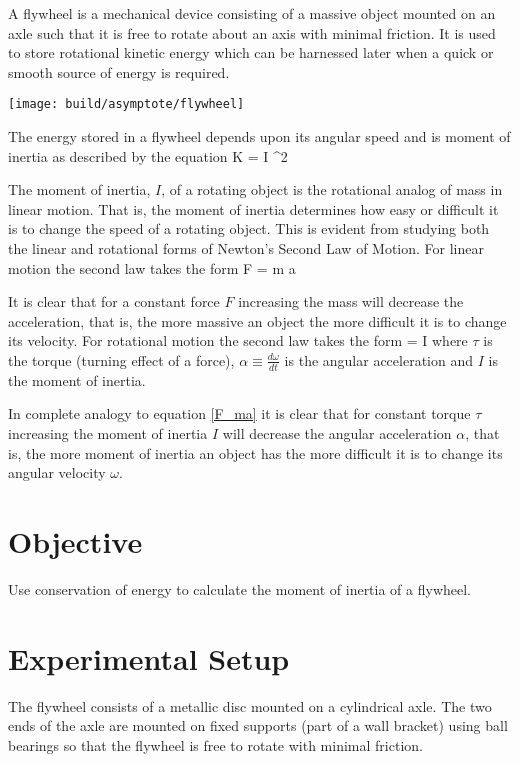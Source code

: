 A flywheel is a mechanical device consisting of a massive object mounted on an axle such that it is free to rotate about an axis with minimal friction. It is used to store rotational kinetic energy which can be harnessed later when a quick or smooth source of energy is required.

\begin{center}
    \texttt{[image: build/asymptote/flywheel]}
\end{center}

The energy stored in a flywheel depends upon its angular speed and is moment of inertia as described by the equation
%
\beq
    K =  I \omega^2
\eeq
%

The moment of inertia, $I$, of a rotating object is the rotational analog of mass in linear motion. That is, the moment of inertia determines how easy or difficult it is to change the speed of a rotating object. This is evident from studying both the linear and rotational forms of Newton's Second Law of Motion. For linear motion the second law takes the form
%
\beq \label{F_ma}
    F = m a
\eeq

It is clear that for a constant force $F$ increasing the mass will decrease the acceleration, that is, the more massive an object the more difficult it is to change its velocity. For rotational motion the second law takes the form
%
\beq
    \tau = I \alpha
\eeq
%
where $\tau$ is the torque (turning effect of a force), $\displaystyle \alpha \equiv \frac{d \omega}{dt}$ is the angular acceleration and $I$ is the moment of inertia.

In complete analogy to equation \eqref{F_ma} it is clear that for constant torque $\tau$ increasing the moment of inertia $I$ will decrease the angular acceleration $\alpha$, that is, the more moment of inertia an object has the more difficult it is to change its angular velocity $\omega$.

\section{Objective}

    Use conservation of energy to calculate the moment of inertia of a flywheel.

\section{Experimental Setup}

    The flywheel consists of a metallic disc mounted on a cylindrical axle. The two ends of the axle are mounted on fixed supports (part of a wall bracket) using ball bearings so that the flywheel is free to rotate with minimal friction.

